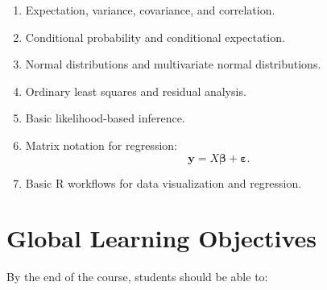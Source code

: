 \documentclass[11pt]{article}
\begin{document}
\begin{enumerate}
    \item Expectation, variance, covariance, and correlation.
    \item Conditional probability and conditional expectation.
    \item Normal distributions and multivariate normal distributions.
    \item Ordinary least squares and residual analysis.
    \item Basic likelihood-based inference.
    \item Matrix notation for regression:
    \[
    \mathbf{y} = X\boldsymbol{\beta} + \boldsymbol{\varepsilon}.
    \]
    \item Basic R workflows for data visualization and regression.
\end{enumerate}

\section{Global Learning Objectives}

By the end of the course, students should be able to:
\end{document}
